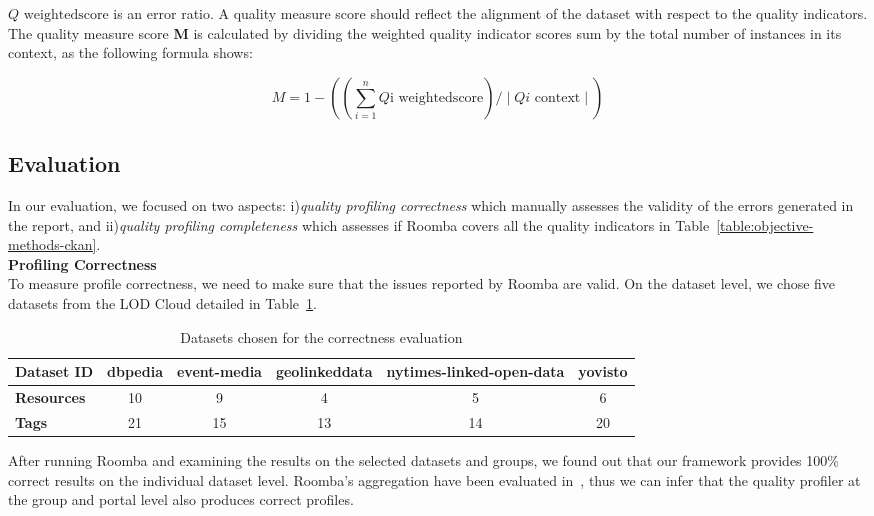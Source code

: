 $Q\textrm{ weightedscore}$ is an error ratio. A quality measure score should reflect the alignment of the dataset with respect to the quality indicators. The quality measure score \textbf{M} is calculated by dividing the weighted quality indicator scores sum by the total number of instances in its context, as the following formula shows:

\begin{equation}
M =  1 - ((\sum_{i=1}^{n} Q\textrm{i weightedscore}) / \mid Qi\textrm{ context} \mid )
\end{equation}

\subsection{Evaluation}

In our evaluation, we focused on two aspects: i)\textit{quality profiling correctness} which manually assesses the validity of the errors generated in the report, and ii)\textit{quality profiling completeness} which assesses if Roomba covers all the quality indicators in Table~\ref{table:objective-methods-ckan}.\\

\textbf{Profiling Correctness}\\
To measure profile correctness, we need to make sure that the issues reported by Roomba are valid. On the dataset level, we chose five datasets from the LOD Cloud detailed in Table~\ref{table:quality_dataset_experiment}.

\begin{table}[ht]
\centering
\begin{adjustwidth}{-.4in}{-.4in}
\begin{tabular}{|l|c|c|c|c|c|}
\hline
\textbf{Dataset ID} & dbpedia & event-media & geolinkeddata & nytimes-linked-open-data & yovisto \\ \hline
\textbf{Resources}  & 10      & 9           & 4             & 5                        & 6       \\ \hline
\textbf{Tags}       & 21      & 15          & 13            & 14                       & 20      \\ \hline
\end{tabular}
\end{adjustwidth}
\caption{Datasets chosen for the correctness evaluation}
\label{table:quality_dataset_experiment}
\end{table}

After running Roomba and examining the results on the selected datasets and groups, we found out that our framework provides 100\% correct results on the individual dataset level. Roomba's aggregation have been evaluated in~\cite{Assaf:ESWC:PROFILES:15}, thus we can infer that the quality profiler at the group and portal level also produces correct profiles.\\

